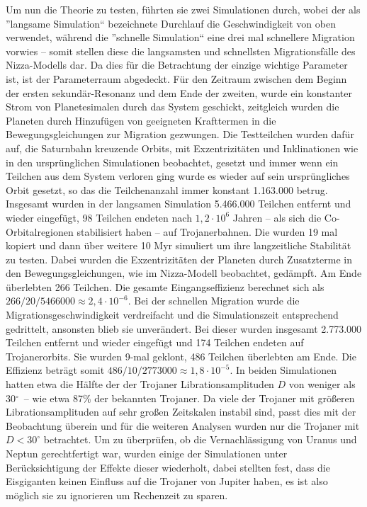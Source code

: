 \documentclass[12pt,a4paper,twoside]{article}
\renewcommand{\cite}{\citep}
\newcommand{\degree}{$^\circ$}
\begin{document}
Um nun die Theorie zu testen, führten sie zwei Simulationen durch,
wobei der als ''langsame Simulation`` bezeichnete Durchlauf die Geschwindigkeit von oben verwendet, während die ''schnelle Simulation`` eine drei mal schnellere Migration vorwies – somit stellen diese die langsamsten und schnellsten Migrationsfälle des Nizza-Modells dar. Da dies für die Betrachtung der einzige wichtige Parameter ist, ist der Parameterraum abgedeckt.
Für den Zeitraum zwischen dem Beginn der ersten sekundär-Resonanz und dem Ende der zweiten, wurde ein konstanter Strom von Planetesimalen durch das System geschickt,
zeitgleich wurden die Planeten durch Hinzufügen von geeigneten Krafttermen in die Bewegungsgleichungen zur Migration gezwungen.
Die Testteilchen wurden dafür auf, die Saturnbahn kreuzende Orbits, mit Exzentrizitäten und Inklinationen wie in den ursprünglichen Simulationen beobachtet, gesetzt und immer wenn ein Teilchen aus dem System verloren ging wurde es wieder auf sein ursprüngliches Orbit gesetzt, so das die Teilchenanzahl immer konstant 1.163.000 betrug.
Insgesamt wurden in der langsamen Simulation 5.466.000 Teilchen entfernt und wieder eingefügt, 98 Teilchen endeten nach $1,2 \cdot 10^6$ Jahren – als sich die Co-Orbitalregionen stabilisiert haben – auf Trojanerbahnen.
Die wurden 19 mal kopiert %
 und dann über weitere 10 Myr simuliert um ihre langzeitliche Stabilität zu testen.
Dabei wurden die Exzentrizitäten der Planeten durch Zusatzterme in den Bewegungsgleichungen, wie im Nizza-Modell beobachtet, gedämpft. Am Ende überlebten 266 Teilchen. Die gesamte Eingangseffizienz berechnet sich als $266/20/5466000 \approx 2,4 \cdot 10^{-6}$.
Bei der schnellen Migration wurde die Migrationsgeschwindigkeit verdreifacht und die Simulationszeit entsprechend gedrittelt, ansonsten blieb sie unverändert.
Bei dieser wurden insgesamt 2.773.000 Teilchen entfernt und wieder eingefügt und 174 Teilchen endeten auf Trojanerorbits. Sie wurden 9-mal geklont, 486 Teilchen überlebten am Ende.
Die Effizienz beträgt somit $486/10/2773000 \approx 1,8 \cdot 10^{-5}$.
In beiden Simulationen hatten etwa die Hälfte der der Trojaner Librationsamplituden $D$ von weniger als 30\degree\ – wie etwa 87\% der bekannten Trojaner.
Da viele der Trojaner mit größeren Librationsamplituden auf sehr großen Zeitskalen instabil sind, passt dies mit der Beobachtung überein und für die weiteren Analysen wurden nur die Trojaner mit $D<30^\circ$ betrachtet. %
Um zu überprüfen, ob die Vernachlässigung von Uranus und Neptun gerechtfertigt war,
wurden einige der Simulationen unter Berücksichtigung der Effekte dieser wiederholt, dabei stellten
\cite{Morbidelli2005} fest, dass die Eisgiganten keinen Einfluss auf die Trojaner von Jupiter haben, es ist also möglich sie zu ignorieren um Rechenzeit zu sparen.
\end{document}
